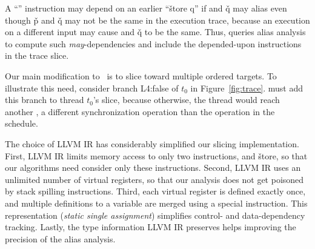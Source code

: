 A ``'' instruction may depend on an earlier ``\v{store q}'' if
 and \v{q} may alias even though \v{p} and \v{q} may not be the
same in the execution trace, because an execution on a different input
may cause  and \v{q} to be the same.  Thus, \peregrine queries alias
analysis to compute such \emph{may}-dependencies and include the depended-upon
instructions in the trace slice.


Our main modification to~\cite{castro:bouncer} is to slice toward multiple
ordered targets.  To illustrate this need, consider branch L4:false of
$t_0$ in Figure~\ref{fig:trace}.  \peregrine must add this branch  to thread
$t_0$'s slice, because otherwise, the thread would reach another
, a different synchronization operation than the
 operation in the schedule.


The choice of LLVM IR has considerably simplified our slicing
implementation.  First, LLVM IR limits memory access to only two
instructions,  and \v{store}, so that our
algorithms need consider only these
instructions.  Second, LLVM IR uses an unlimited number of virtual registers,
so that our analysis does not get poisoned by stack spilling instructions.
Third, each virtual register is defined exactly once, and multiple
definitions to a variable are merged using a special instruction.  This
representation (\emph{static single assignment}) simplifies
control- and data-dependency tracking.  Lastly, the type information LLVM IR
preserves helps improving the precision of the alias analysis.





